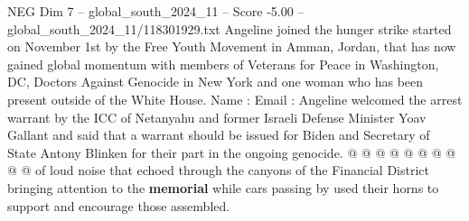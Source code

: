 \begin{textsample}{NEG Dim 7 – global\_south\_2024\_11 – Score -5.00 – global\_south\_2024\_11/118301929.txt}
Angeline joined the hunger strike started on November 1st by the Free Youth Movement in Amman, Jordan, that has now gained global momentum with members of Veterans for Peace in Washington, DC, Doctors Against Genocide in New York and one woman who has been present outside of the White House.
Name : Email : Angeline welcomed the arrest warrant by the ICC of Netanyahu and former Israeli Defense Minister Yoav Gallant and said that a warrant should be issued for Biden and Secretary of State Antony Blinken for their part in the ongoing genocide. @ @ @ @ @ @ @ @ @ @ of loud noise that echoed through the canyons of the Financial District bringing attention to the \textbf{memorial} while cars passing by used their horns to support and encourage those assembled.

\end{textsample}
